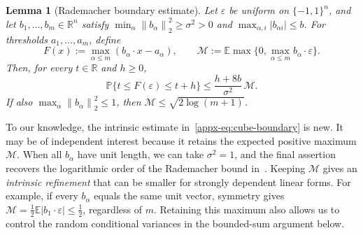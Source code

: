 \documentclass[11pt,letterpaper]{article}
\newtheorem{lemma}{Lemma}
\theoremstyle{remark}
\newcommand{\E}{\mathbb E}
\newcommand{\Pp}{\mathbb P}
\newcommand{\R}{\mathbb R}
\newcommand{\norm}[1]{\left\lVert#1\right\rVert}
\begin{document}
\begin{lemma}[Rademacher boundary estimate]\label{appx-lem:cube-boundary}
Let \(\varepsilon\) be uniform on \(\{-1,1\}^n\), and let
\(b_1,\ldots,b_m\in\R^n\) satisfy
\(\min_\alpha\norm{b_\alpha}_2^2\ge\sigma^2>0\) and
\(\max_{\alpha,i}|b_{\alpha i}|\le b\).
For thresholds \(a_1,\ldots,a_m\), define
\[
 F(x):=\max_{\alpha\le m}(b_\alpha\cdot x-a_\alpha),
 \qquad
 \mathcal M:=\E\max\{0,\max_{\alpha\le m}b_\alpha\cdot\varepsilon\}.
\]
Then, for every \(t\in\R\) and \(h\ge0\),
\begin{equation}
 \Pp\{t\le F(\varepsilon)\le t+h\}
 \le\frac{h+8b}{\sigma^2}\,\mathcal M.
 \label{appx-eq:cube-boundary}
\end{equation}
If also \(\max_\alpha\norm{b_\alpha}_2^2\le1\), then
\(\mathcal M\le\sqrt{2\log(m+1)}\).
\end{lemma}

To our knowledge, the intrinsic estimate in~\eqref{appx-eq:cube-boundary}
is new. It may be of independent interest because it retains the
expected positive maximum \(\mathcal M\).
When all \(b_\alpha\) have unit length, we can take \(\sigma^2=1\),
and the final assertion recovers the logarithmic order of the
Rademacher bound in~\cite{OST,CCKK2022}. Keeping \(\mathcal M\)
gives an \emph{intrinsic refinement} that can be smaller for strongly
dependent linear forms. For example, if every \(b_\alpha\) equals
the same unit vector, symmetry gives
\(\mathcal M=\tfrac12\E|b_1\cdot\varepsilon|\le\tfrac12\),
regardless of \(m\). Retaining this maximum also allows us to control
the random conditional variances in the bounded-sum argument below.
\end{document}

